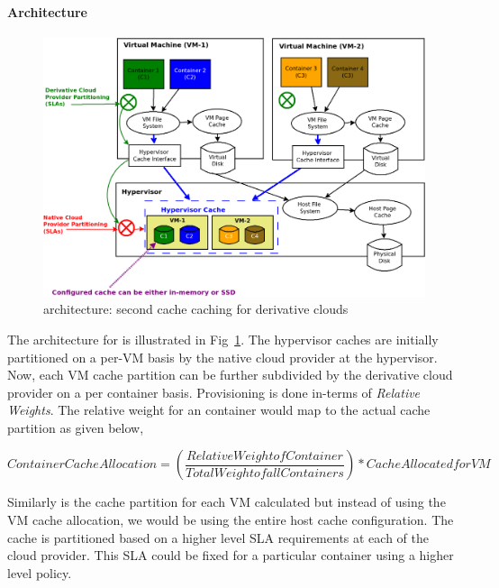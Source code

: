    \paragraph{Architecture}
    \label{sec:double_decker_architecture}
    
      \begin{figure}
	\centering
	\includegraphics[width=1\textwidth]{images/background/double_decker.png}
	\caption{\dd{} architecture: second cache caching for derivative clouds}
	\label{img:doube_decker_architecure}
      \end{figure}
      
	The architecture for \dd{} is illustrated in Fig~\ref{img:doube_decker_architecure}. The hypervisor caches are initially partitioned on a per-VM
	basis by the native cloud provider at the hypervisor. Now, each VM cache partition can be further subdivided by the derivative cloud provider 
	on a per container basis. Provisioning is done in-terms of \textit{Relative Weights}. The relative weight for an container would map to the
	actual cache partition as given below,
	  
	  \begin{center}
	    \begin{equation}
	    \label{eq:cache_allocation}
	      Container Cache Allocation = ( \frac{Relative Weight of Container}{Total Weight of all Containers} ) * Cache Allocated for VM
	    \end{equation}
	  \end{center}
	  
	Similarly is the cache partition for each VM calculated but instead of using the VM cache allocation, we would be using the entire 
	host cache configuration. The cache is partitioned based on a higher level SLA requirements at each of the cloud provider. This SLA could
	be fixed for a particular container using a higher level policy. 
	  
